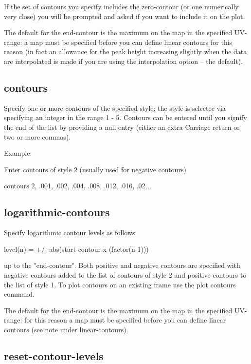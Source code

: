 If the set of contours you specify includes the zero-contour
(or one numerically very close) you will be prompted and asked
if you want to include it on the plot.

The default for the end-contour is the maximum on the map in
the specified UV-range: a map must be specified before you can
define linear contours for this reason (in fact an allowance
for the peak height increasing slightly when the data are
interpolated is made if you are using the interpolation option
-- the default).

\subsection{contours}


Specify one or more contours of the specified style; the style is
selectec via specifying an integer in the range 1 - 5.  Contours
can be entered until you signify the end of the list by providing
a null entry (either an extra Carriage return or two or more commas).

Example:

Enter contours of style 2 (usually used for negative contours)

   contours 2, .001, .002, .004, .008, .012, .016, .02,,,

\subsection{logarithmic-contours}


Specify logarithmic contour levels as follows:

        level(n) = +/-  abs(start-contour x (factor(n-1)))

up to the "end-contour". Both positive and negative contours
are specified with negative contours added to the
list of contours of style 2 and positive contours to the list
of style 1. To plot contours on an existing frame use the plot
contours command.

The default for the end-contour is the maximum on the map in
the specified UV-range: for this reason a map must be specified
before you can define linear contours (see note under
linear-contours).


\subsection{reset-contour-levels}

